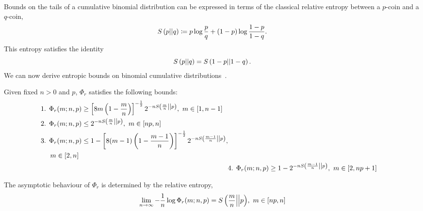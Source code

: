 \documentclass[pra,
aps,
twocolumn,
superscriptaddress,
groupedaddress,
nofootinbib,
reprint
]{revtex4-1}
\begin{document}
Bounds on the tails of a cumulative binomial distribution can be expressed in terms of the classical relative entropy between a $p$-coin and a $q$-coin,
\begin{equation}\label{eq:ent_rel}
	S\left( p \middle\vert\middle\vert q \right) \coloneqq p \log{\frac{p}{q}} + (1-p) \log{\frac{1-p}{1-q}}.
\end{equation}
This entropy satisfies the identity
\begin{equation}
	S\left( p \middle\vert\middle\vert q \right) = S\left( 1-p \middle\vert\middle\vert 1-q \right).
\end{equation}
We can now derive entropic bounds on binomial cumulative distributions~\cite{cit:ash}.
\begin{lemma}\label{lem:phir_bounds}
	Given fixed $n>0$ and $p$, $\Phi_r$ satisfies the following bounds:
	\begin{align*}
		\begin{split}
		&\text{1. } \Phi_r(m; n, p) \geq \left[ 8m\left(1-\frac{m}{n}\right) \right]^{-\frac{1}{2}} 2^{-n{S\left( \frac{m}{n} \middle\vert\middle\vert p \right)}},\ m\in [1,n-1] \\
		&\text{2. } \Phi_r(m; n, p) \leq 2^{-n{S\left( \frac{m}{n} \middle\vert\middle\vert p \right)}},\ m\in [np,n] \\
		&\text{3. } \Phi_r(m; n, p) \leq 1 - \left[ 8(m-1)\left(1-\frac{m-1}{n}\right) \right]^{-\frac{1}{2}} 2^{-nS\left( \frac{m-1}{n} \middle\vert\middle\vert p \right)}, \\
		&\hspace{14pt} m\in [2,n]
		\end{split}
		\\
		&\text{4. } \Phi_r(m; n, p) \geq 1 - 2^{-nS\left( \frac{m-1}{n} \middle\vert\middle\vert p \right)},\ m\in [2,np+1]
	\end{align*}
	
	The asymptotic behaviour of $\Phi_r$ is determined by the relative entropy, 
	\begin{equation}
		\lim_{n\rightarrow\infty}{-\frac{1}{n}\log{\Phi_r(m; n, p)} = S\left( \frac{m}{n} \middle\vert\middle\vert p \right)},\ m\in [np,n]
	\end{equation}
\end{lemma}
\end{document}
